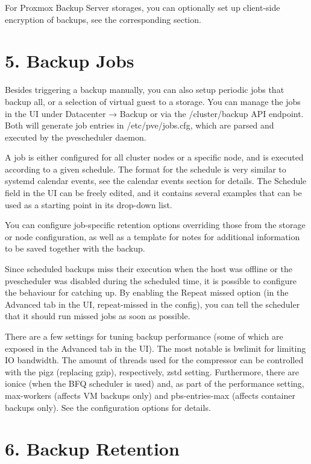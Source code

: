 For Proxmox Backup Server storages, you can optionally set up client-side encryption of backups, see the corresponding section.


\section{5. Backup Jobs}

Besides triggering a backup manually, you can also setup periodic jobs that backup all, or a selection of virtual guest to a storage. You can manage the jobs in the UI under Datacenter → Backup or via the /cluster/backup API endpoint. Both will generate job entries in /etc/pve/jobs.cfg, which are parsed and executed by the pvescheduler daemon.

A job is either configured for all cluster nodes or a specific node, and is executed according to a given schedule. The format for the schedule is very similar to systemd calendar events, see the calendar events section for details. The Schedule field in the UI can be freely edited, and it contains several examples that can be used as a starting point in its drop-down list.

You can configure job-specific retention options overriding those from the storage or node configuration, as well as a template for notes for additional information to be saved together with the backup.

Since scheduled backups miss their execution when the host was offline or the pvescheduler was disabled during the scheduled time, it is possible to configure the behaviour for catching up. By enabling the Repeat missed option (in the Advanced tab in the UI, repeat-missed in the config), you can tell the scheduler that it should run missed jobs as soon as possible.

There are a few settings for tuning backup performance (some of which are exposed in the Advanced tab in the UI). The most notable is bwlimit for limiting IO bandwidth. The amount of threads used for the compressor can be controlled with the pigz (replacing gzip), respectively, zstd setting. Furthermore, there are ionice (when the BFQ scheduler is used) and, as part of the performance setting, max-workers (affects VM backups only) and pbs-entries-max (affects container backups only). See the configuration options for details.


\section{6. Backup Retention}

